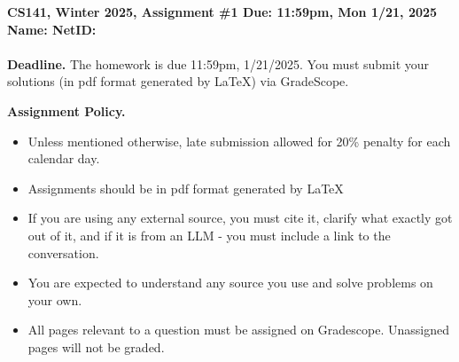 \documentclass{article}[12pt]
\newcommand{\policy}[1]{#1}
\newcommand{\policy}[1]{}
\newcommand{\deadline}{11:59pm, Mon 1/21, 2025}
\newcommand{\assigntitle}[1]{{
  \noindent \large \bf
  CS141, Winter 2025,
  Assignment \##1 \hfill Due: {\deadline}\\
  Name:  %
  \hspace{2.5in}
  NetID:  %
  \\
  [-.05in]
  \mbox{}\hrulefill \mbox{}\\}}
\begin{document}
\assigntitle{1}{}
\policy{\textbf{Deadline.} The homework is due 11:59pm, 1/21/2025. You must submit your solutions (in pdf
format generated by LaTeX) via GradeScope.}\\
\date{}
\policy{\textbf{Assignment Policy.}
\begin{itemize}
    \item Unless mentioned otherwise, late submission allowed for 20\% penalty for each calendar day.
    \item Assignments should be in pdf format generated by LaTeX
    \item If you are using any external source, you must cite it, clarify what exactly got out of it, and if it is from an LLM - you must include a link to the conversation.
    \item You are expected to understand any source you use and solve problems on your own.
    \item All pages relevant to a question must be assigned on Gradescope. Unassigned pages will not be graded.
\end{itemize}


}
\end{document}
